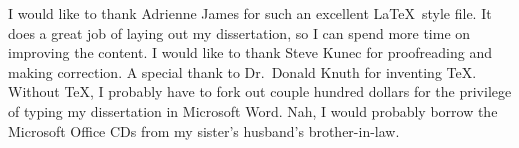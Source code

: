 I would like to thank Adrienne James for such an excellent \LaTeX\ style file.  It
does a great job of laying out my dissertation, so I can spend more time on
improving the content.  I would like to thank Steve Kunec for proofreading and making correction.  A special thank to Dr.\ Donald Knuth for inventing
\TeX.  Without \TeX, I probably have to fork out couple hundred dollars for
the privilege of typing my dissertation in Microsoft Word.  Nah, I would
probably borrow the Microsoft Office CDs from my sister's husband's
brother-in-law.
